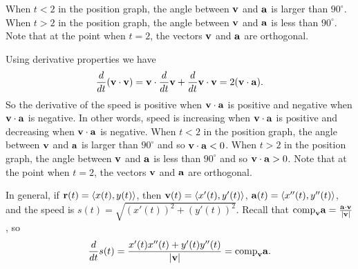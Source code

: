 \begin{activitySolution}
\item When $t < 2$ in the position graph, the angle between $\mathbf{v}$ and $\mathbf{a}$ is larger than $90^{\circ}$. When $t > 2$ in the position graph, the angle between $\mathbf{v}$ and $\mathbf{a}$ is less than $90^{\circ}$. Note that at the point when $t=2$, the vectors $\mathbf{v}$ and $\mathbf{a}$ are orthogonal.

	\item Using derivative properties we have 
	\[\frac{d}{dt}(\mathbf{v}\cdot\mathbf{v}) = \mathbf{v} \cdot \frac{d}{dt} \mathbf{v} + \frac{d}{dt} \mathbf{v} \cdot \mathbf{v} = 2(\mathbf{v} \cdot \mathbf{a}).\]
	So the derivative of the speed is positive when $\mathbf{v} \cdot \mathbf{a}$ is positive and negative when $\mathbf{v} \cdot \mathbf{a}$ is negative. In other words, speed is increasing when $\mathbf{v} \cdot \mathbf{a}$ is positive and decreasing when $\mathbf{v} \cdot \mathbf{a}$ is negative. When $t < 2$ in the position graph, the angle between $\mathbf{v}$ and $\mathbf{a}$ is larger than $90^{\circ}$ and so $\mathbf{v} \cdot \mathbf{a} < 0$. When $t > 2$ in the position graph, the angle between $\mathbf{v}$ and $\mathbf{a}$ is less than $90^{\circ}$ and so $\mathbf{v} \cdot \mathbf{a} > 0$. Note that at the point when $t=2$, the vectors $\mathbf{v}$ and $\mathbf{a}$ are orthogonal.  

\item In general, if $\mathbf{r}(t) = \langle x(t), y(t) \rangle$, then $\mathbf{v}(t) = \langle x'(t), y'(t) \rangle$, $\mathbf{a}(t) = \langle x''(t), y''(t) \rangle$, and the speed is $s(t) = \sqrt{(x'(t))^2 + (y'(t))^2}$. Recall that $\text{comp}_{\mathbf{v}} \mathbf{a} = \frac{\mathbf{a} \cdot \mathbf{v}}{|\mathbf{v}|}$, so
\[\frac{d}{dt} s(t) = \frac{x'(t)x''(t) +y'(t)y''(t)}{|\mathbf{v}|} = \text{comp}_{\mathbf{v}} \mathbf{a}.\]
 

   \ea

\end{activitySolution}
\aftera
